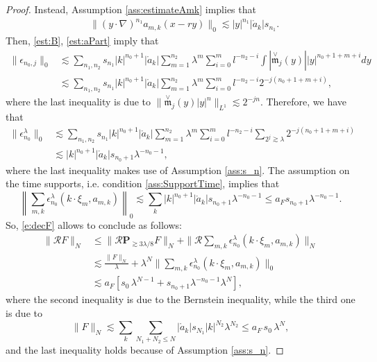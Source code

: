 \documentclass[10pt,a4paper]{amsart}
\numberwithin{equation}{section}
\numberwithin{corollario}{section}
\numberwithin{lemma}{section}
\numberwithin{prop}{section}
\theoremstyle{definition}
\theoremstyle{remark}
\newcommand{\proj}{\mathbf{P}}
\begin{document}
\begin{proof}
Instead, Assumption \ref{ass:estimateAmk} implies that
\begin{align}
    &\label{est:aPart}\|(y\cdot \nabla)^{n_1}a_{m,k}(x-ry)\|_0\lesssim |y|^{n_1}|\mathring{a}_k|s_{n_1}.
\end{align}
Then, \eqref{est:B}, \eqref{est:aPart} imply that
    \begin{align}
        \|\epsilon_{n_0,j}\|_0&\lesssim \sum_{n_1,n_2}s_{n_1}|k|^{n_0+1}|\mathring{a}_k|\sum_{m=1}^{n_2}\lambda^m\sum_{i=0}^ml^{-n_2-i}\int |\overset{\vee}{\mathfrak{m}}_{j}(y)||y|^{n_0+1+m+i}dy\\
        &\lesssim \sum_{n_1,n_2}s_{n_1}|k|^{n_0+1}|\mathring{a}_k|\sum_{m=1}^{n_2}\lambda^m\sum_{i=0}^ml^{-n_2-i}2^{-j(n_0+1+m+i)},
    \end{align}
where the last inequality is due to $\|\overset{\vee}{\mathfrak{m}}_{j}(y)|y|^n\|_{L^1}\lesssim2^{-jn}$.
Therefore, we have that 
\begin{align}\label{est:epsN0L}
    \|\epsilon_{n_0}^{\lambda}\|_0
    &\lesssim
    \sum_{n_1,n_2}s_{n_1}|k|^{n_0+1}|\mathring{a}_k|\sum_{m=1}^{n_2}\lambda^m\sum_{i=0}^ml^{-n_2-i}\sum_{2^j\gtrsim\lambda}2^{-j(n_0+1+m+i)}
    \\ \nonumber
    &\lesssim |k|^{n_0+1}|\mathring{a}_k|s_{n_0+1}\lambda^{-n_0-1},
\end{align}
where the last inequality makes use of Assumption \ref{ass:s_n}.
The assumption on the time supports, i.e. condition \ref{ass:SupportTime}, implies that 
\begin{equation}\label{e:epsN0LSum}
    \left\|\sum_{m,k}\epsilon_{n_0}^{\lambda}(k\cdot \xi_m,a_{m,k})\right\|_0
    \lesssim
    \sum_{k}|k|^{n_0+1}|\mathring{a}_k|s_{n_0+1}\lambda^{-n_0-1}\le a_Fs_{n_0+1}\lambda^{-n_0-1}.
\end{equation}
So, \eqref{e:decF} allows to conclude as follows:
    \begin{align}
        \|\mathcal{R}F\|_N&\le \|\mathcal{R}\proj_{\gtrsim3\lambda/8}F\|_N+\|\mathcal{R}\sum_{m,k}\epsilon^{\lambda}_{n_0}(k\cdot\xi_m,a_{m,k})\|_N\\
        &\lesssim \frac{\|F\|_N}{\lambda}+\lambda^N\|\sum_{m,k}\epsilon_{n_0}^{\lambda}(k\cdot \xi_m,a_{m,k})\|_0\\
        &\lesssim a_F[s_0\,\lambda^{N-1}+s_{n_0+1}\lambda^{-n_0-1} \lambda^N],
    \end{align}
where the second inequality is due to the Bernstein inequality, while the third one is due to
\begin{equation}\label{est:Fnorm}
\|F\|_N\lesssim\sum_k\sum_{N_1+N_2\le N}|\mathring{a}_k| s_{N_1}|k|^{N_2}\lambda^{N_2}\le a_F\, s_0\,\lambda^N,
\end{equation}
and the last inequality holds because of Assumption \ref{ass:s_n}.
\end{proof}
\end{document}
